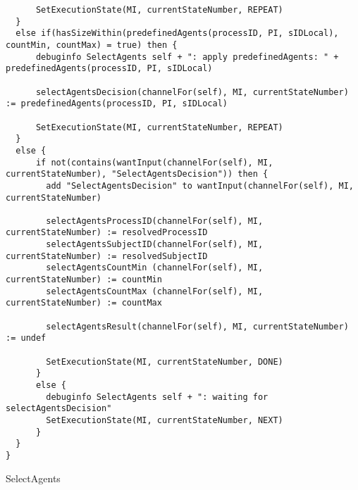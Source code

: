 \begin{listing}[H]
\begin{verbatim}
      SetExecutionState(MI, currentStateNumber, REPEAT)
  }
  else if(hasSizeWithin(predefinedAgents(processID, PI, sIDLocal), countMin, countMax) = true) then {
      debuginfo SelectAgents self + ": apply predefinedAgents: " + predefinedAgents(processID, PI, sIDLocal)

      selectAgentsDecision(channelFor(self), MI, currentStateNumber) := predefinedAgents(processID, PI, sIDLocal)

      SetExecutionState(MI, currentStateNumber, REPEAT)
  }
  else {
      if not(contains(wantInput(channelFor(self), MI, currentStateNumber), "SelectAgentsDecision")) then {
        add "SelectAgentsDecision" to wantInput(channelFor(self), MI, currentStateNumber)

        selectAgentsProcessID(channelFor(self), MI, currentStateNumber) := resolvedProcessID
        selectAgentsSubjectID(channelFor(self), MI, currentStateNumber) := resolvedSubjectID
        selectAgentsCountMin (channelFor(self), MI, currentStateNumber) := countMin
        selectAgentsCountMax (channelFor(self), MI, currentStateNumber) := countMax

        selectAgentsResult(channelFor(self), MI, currentStateNumber) := undef

        SetExecutionState(MI, currentStateNumber, DONE)
      }
      else {
        debuginfo SelectAgents self + ": waiting for selectAgentsDecision"
        SetExecutionState(MI, currentStateNumber, NEXT)
      }
  }
}
\end{verbatim}
\caption{SelectAgents}
\label{lst:asm:SelectAgents}
\end{listing}
